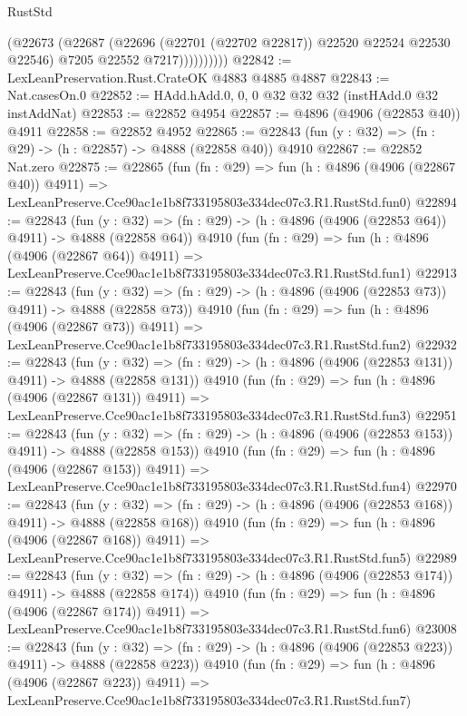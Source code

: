 \begin{lexlean}{RustStd}
\begin{coremodule}
                    (@22673
                      (@22687
                        (@22696 (@22701 (@22702 @22817)) @22520 @22524 @22530 @22546)
                        @7205
                        @22552
                        @7217))))))))))
@22842 := LexLeanPreservation.Rust.CrateOK @4883 @4885 @4887
@22843 := Nat.casesOn.{0}
@22852 := HAdd.hAdd.{0, 0, 0} @32 @32 @32 (instHAdd.{0} @32 instAddNat)
@22853 := @22852 @4954
@22857 := @4896 (@4906 (@22853 @40)) @4911
@22858 := @22852 @4952
@22865 := @22843 (fun (y : @32) => (fn : @29) -> (h : @22857) -> @4888 (@22858 @40)) @4910
@22867 := @22852 Nat.zero
@22875 := @22865
    (fun (fn : @29) =>
    fun (h : @4896 (@4906 (@22867 @40)) @4911) =>
    LexLeanPreserve.Cce90ac1e1b8f733195803e334dec07c3.R1.RustStd.fun0)
@22894 := @22843
    (fun (y : @32) => (fn : @29) -> (h : @4896 (@4906 (@22853 @64)) @4911) -> @4888 (@22858 @64))
    @4910
    (fun (fn : @29) =>
    fun (h : @4896 (@4906 (@22867 @64)) @4911) =>
    LexLeanPreserve.Cce90ac1e1b8f733195803e334dec07c3.R1.RustStd.fun1)
@22913 := @22843
    (fun (y : @32) => (fn : @29) -> (h : @4896 (@4906 (@22853 @73)) @4911) -> @4888 (@22858 @73))
    @4910
    (fun (fn : @29) =>
    fun (h : @4896 (@4906 (@22867 @73)) @4911) =>
    LexLeanPreserve.Cce90ac1e1b8f733195803e334dec07c3.R1.RustStd.fun2)
@22932 := @22843
    (fun (y : @32) => (fn : @29) -> (h : @4896 (@4906 (@22853 @131)) @4911) -> @4888 (@22858 @131))
    @4910
    (fun (fn : @29) =>
    fun (h : @4896 (@4906 (@22867 @131)) @4911) =>
    LexLeanPreserve.Cce90ac1e1b8f733195803e334dec07c3.R1.RustStd.fun3)
@22951 := @22843
    (fun (y : @32) => (fn : @29) -> (h : @4896 (@4906 (@22853 @153)) @4911) -> @4888 (@22858 @153))
    @4910
    (fun (fn : @29) =>
    fun (h : @4896 (@4906 (@22867 @153)) @4911) =>
    LexLeanPreserve.Cce90ac1e1b8f733195803e334dec07c3.R1.RustStd.fun4)
@22970 := @22843
    (fun (y : @32) => (fn : @29) -> (h : @4896 (@4906 (@22853 @168)) @4911) -> @4888 (@22858 @168))
    @4910
    (fun (fn : @29) =>
    fun (h : @4896 (@4906 (@22867 @168)) @4911) =>
    LexLeanPreserve.Cce90ac1e1b8f733195803e334dec07c3.R1.RustStd.fun5)
@22989 := @22843
    (fun (y : @32) => (fn : @29) -> (h : @4896 (@4906 (@22853 @174)) @4911) -> @4888 (@22858 @174))
    @4910
    (fun (fn : @29) =>
    fun (h : @4896 (@4906 (@22867 @174)) @4911) =>
    LexLeanPreserve.Cce90ac1e1b8f733195803e334dec07c3.R1.RustStd.fun6)
@23008 := @22843
    (fun (y : @32) => (fn : @29) -> (h : @4896 (@4906 (@22853 @223)) @4911) -> @4888 (@22858 @223))
    @4910
    (fun (fn : @29) =>
    fun (h : @4896 (@4906 (@22867 @223)) @4911) =>
    LexLeanPreserve.Cce90ac1e1b8f733195803e334dec07c3.R1.RustStd.fun7)

\end{coremodule}
\end{lexlean}
